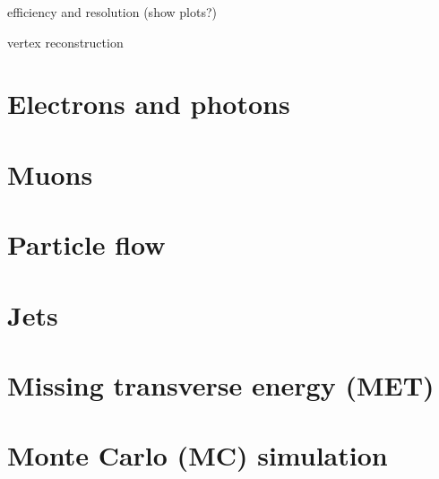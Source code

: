efficiency and resolution (show plots?)

vertex reconstruction

\section{Electrons and photons}
\label{sec:electrons_reco}

\section{Muons}
\label{sec:muons_reco}

\section{Particle flow}
\label{sec:pflow_reco}

\section{Jets}
\label{sec:jets_reco}

\section{Missing transverse energy (MET)}
\label{sec:met_reco}

\section{Monte Carlo (MC) simulation}
\label{sec:mc_reco}

